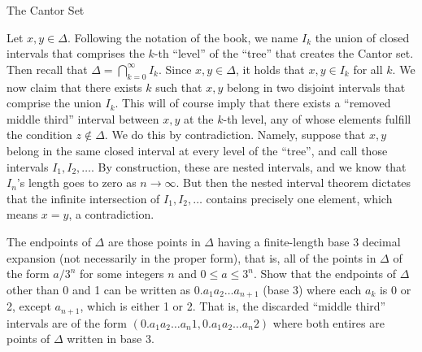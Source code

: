 \begin{section}{The Cantor Set}
\begin{solution}
    Let $x, y \in \Delta$.
    Following the notation of the book, we name $I_k$ the union of closed intervals that comprises the $k$-th ``level'' of the ``tree'' that creates the Cantor set.
    Then recall that $\Delta = \bigcap_{k=0}^{\infty} I_k$.
    Since $x, y \in \Delta$, it holds that $x, y \in I_k$ for all $k$.
    We now claim that there exists $k$ such that $x, y$ belong in two disjoint intervals that comprise the union $I_k$.
    This will of course imply that there exists a ``removed middle third'' interval between $x, y$ at the $k$-th level, any of whose elements fulfill the condition $z \notin \Delta$.
    We do this by contradiction. 
    Namely, suppose that $x, y$ belong in the same closed interval at every level of the ``tree'', and call those intervals $I_1, I_2, \ldots$.
    By construction, these are nested intervals, and we know that $I_n$'s length goes to zero as $n \rightarrow \infty$.
    But then the nested interval theorem dictates that the infinite intersection of $I_1, I_2, \ldots$ contains precisely one element, which means $x = y$, a contradiction.
\end{solution}

\begin{exercise}{23}
    The endpoints of $\Delta$ are those points in $\Delta$ having a finite-length base 3 decimal expansion (not necessarily in the proper form), that is, all of the points in $\Delta$ of the form $a/3^n$ for some integers $n$ and $0 \leq a \leq 3^n$.
    Show that the endpoints of $\Delta$ other than 0 and 1 can be written as $0.a_1 a_2 \ldots a_{n+1}$ (base 3) where each $a_k$ is 0 or 2, except $a_{n+1}$, which is either 1 or 2.
    That is, the discarded ``middle third'' intervals are of the form $(0.a_1 a_2 \ldots a_n 1, 0.a_1 a_2 \ldots a_n 2)$ where both entires are points of $\Delta$ written in base 3.
\end{exercise}

\begin{solution}
    

\end{solution}
\end{section}
